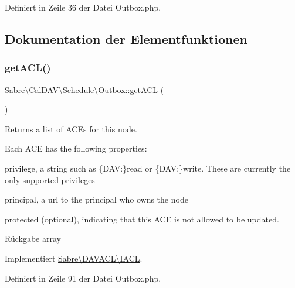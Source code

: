 Definiert in Zeile 36 der Datei Outbox.\+php.



\subsection{Dokumentation der Elementfunktionen}
\mbox{\label{class_sabre_1_1_cal_d_a_v_1_1_schedule_1_1_outbox_afe3f32920f90bbb243a9f5f705548d49}} 
\subsubsection{\texorpdfstring{get\+A\+C\+L()}{getACL()}}
{\footnotesize\ttfamily Sabre\textbackslash{}\+Cal\+D\+A\+V\textbackslash{}\+Schedule\textbackslash{}\+Outbox\+::get\+A\+CL (\begin{DoxyParamCaption}{ }\end{DoxyParamCaption})}

Returns a list of A\+CE\textquotesingle{}s for this node.

Each A\+CE has the following properties\+:
\begin{DoxyItemize}
\item \textquotesingle{}privilege\textquotesingle{}, a string such as \{D\+AV\+:\}read or \{D\+AV\+:\}write. These are currently the only supported privileges
\item \textquotesingle{}principal\textquotesingle{}, a url to the principal who owns the node
\item \textquotesingle{}protected\textquotesingle{} (optional), indicating that this A\+CE is not allowed to be updated.
\end{DoxyItemize}

\begin{DoxyReturn}{Rückgabe}
array 
\end{DoxyReturn}


Implementiert \mbox{\hyperlink{interface_sabre_1_1_d_a_v_a_c_l_1_1_i_a_c_l_a8fe3b3a5b48eae789d7eb722b340045c}{Sabre\textbackslash{}\+D\+A\+V\+A\+C\+L\textbackslash{}\+I\+A\+CL}}.



Definiert in Zeile 91 der Datei Outbox.\+php.


